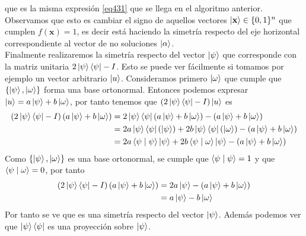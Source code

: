 \documentclass[a4paper]{article}
\numberwithin{equation}{section}
\begin{document}
que es la misma expresión \ref{eq431} que se llega en el algoritmo anterior. Observamos que esto es cambiar el signo de aquellos vectores $\ket{\mathbf{x}}\in\{0,1\}^n$ que cumplen $f(\mathbf{x}) = 1$, es decir está haciendo la simetría respecto del eje horizontal correspondiente al vector de no soluciones $\ket{\alpha}$.\\
\linebreak
Finalmente realizaremos la simetría respecto del vector $\ket{\psi}$ que corresponde con la matriz unitaria $2\ket{\psi}\bra{\psi} - I$.
Esto se puede ver fácilmente si tomamos por ejemplo un vector arbitrario $\ket{u}$. Consideramos primero $\ket{\omega}$ que cumple que $\{ \ket{\psi}, \ket{\omega} \}$ forma una base ortonormal. Entonces podemos expresar $\ket{u} = a\ket{\psi} + b\ket{\omega}$, por tanto tenemos que $\left( 2\ket{\psi}\bra{\psi} - I \right) \ket{u}$ es
\begin{equation}
\begin{split}
\left( 2\ket{\psi}\bra{\psi} - I \right) \left( a\ket{\psi} + b\ket{\omega} \right)
&=
2 \ket{\psi}\bra{\psi} \left( a\ket{\psi} + b\ket{\omega} \right) - \left( a\ket{\psi} + b\ket{\omega} \right)
\\ &=
2a \ket{\psi}\bra{\psi} \left( \ket{\psi} \right) + 2b \ket{\psi}\bra{\psi} \left( \ket{\omega} \right) - \left( a\ket{\psi} + b\ket{\omega} \right)
\\ &=
2a \braket{\psi \mid \psi} \ket{\psi} + 2b \braket{\psi \mid \omega} \ket{\psi} - \left( a\ket{\psi} + b\ket{\omega} \right)
\end{split}
\end{equation}
Como $\{ \ket{\psi}, \ket{\omega} \}$ es una base ortonormal, se cumple que $\braket{\psi \mid \psi} = 1$ y que $\braket{\psi \mid \omega} = 0$, por tanto
\begin{equation}
\begin{split}
\left( 2\ket{\psi}\bra{\psi} - I \right) \left( a\ket{\psi} + b\ket{\omega} \right)
&=
2a \ket{\psi} - \left( a\ket{\psi} + b\ket{\omega} \right)
\\ &=
a\ket{\psi} - b\ket{\omega}
\end{split}
\end{equation}
Por tanto se ve que es una simetría respecto del vector $\ket{\psi}$. Además podemos ver que $\ket{\psi}\bra{\psi}$ es una proyección sobre $\ket{\psi}$.
\end{document}
